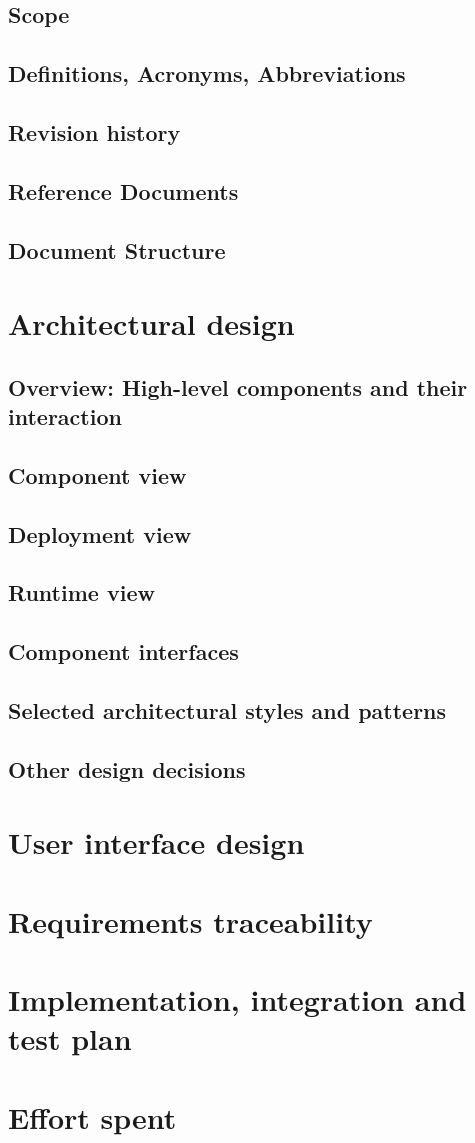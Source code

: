 \documentclass{article}
\begin{document}
\subsection{Scope}
\subsection{Definitions, Acronyms, Abbreviations}
\subsection{Revision history}
\subsection{Reference Documents}
\subsection{Document Structure}

\section{Architectural design}
\subsection{Overview: High-level components and their interaction}
\subsection{Component view}
\subsection{Deployment view}
\subsection{Runtime view}
\subsection{Component interfaces}
\subsection{Selected architectural styles and patterns}
\subsection{Other design decisions}

\section{User interface design}

\section{Requirements traceability}

\section{Implementation, integration and test plan}

\section{Effort spent}
\end{document}
